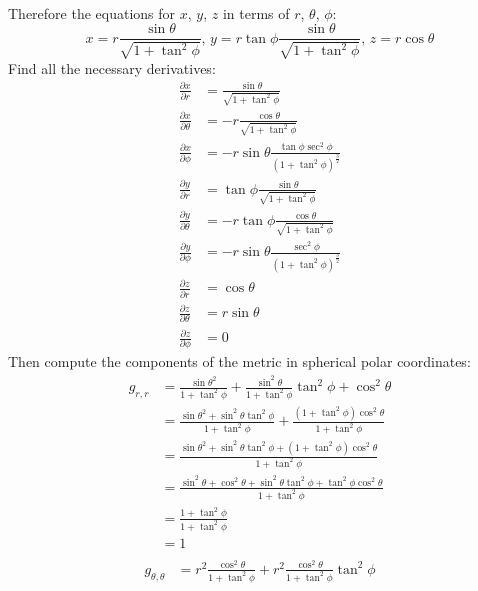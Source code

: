 \documentclass[a4paper]{article}
\begin{document}
\begin{enumerate}
\begin{enumerate}
\[\begin{align*}
    \end{align*}
  \]
  Therefore the equations for $x$, $y$, $z$ in terms of $r$, $\theta$, $\phi$:
  \[
    x = r \frac{\sin\theta}{\sqrt{1+\tan^2\phi} }\text{,\ \ }
    y = r \tan\phi \frac{\sin \theta}{\sqrt{1+\tan^2\phi}}\text{,\ \ }
    z = r \cos\theta
  \]
  Find all the necessary derivatives:
  \[
    \begin{align*}
    \frac{\partial x}{\partial r} &= \frac{\sin\theta}{\sqrt{1+\tan^2\phi}}\\
    \frac{\partial x}{\partial \theta} &= -r\frac{\cos\theta}{\sqrt{1+\tan^2\phi}}\\
    \frac{\partial x}{\partial \phi} &= -r \sin \theta \frac{\tan\phi \sec^2\phi}{(1+\tan^2\phi)^\frac{3}{2}} \\
    \frac{\partial y}{\partial r} &= \tan\phi\frac{\sin\theta}{\sqrt{1+\tan^2\phi} }\\
    \frac{\partial y}{\partial \theta} &= -r \tan\phi\frac{\cos\theta}{\sqrt{1+\tan^2\phi}}\\
    \frac{\partial y}{\partial \phi} &= -r\sin\theta \frac{\sec^2\phi}{(1+\tan^2\phi)^\frac{3}{2}}\\
    \frac{\partial z}{\partial r} &= \cos\theta\\
    \frac{\partial z}{\partial \theta} &= r\sin\theta\\
    \frac{\partial z}{\partial \phi} &= 0
    \end{align*}
  \]
  Then compute the components of the metric in spherical polar coordinates:
  \[
    \begin{align*}
      g_{r,r}&=\frac{\sin\theta^2}{1+\tan^2\phi} + \frac{\sin^2\theta}{1+\tan^2\phi}\tan^2\phi + \cos^2\theta\\
      &=\frac{\sin\theta^2 + \sin^2\theta\tan^2\phi}{1+\tan^2\phi} +\frac{(1+\tan^2\phi)\cos^2\theta}{1+\tan^2\phi}\\
      &=\frac{\sin\theta^2 + \sin^2\theta\tan^2\phi+(1+\tan^2\phi)\cos^2\theta}{1+\tan^2\phi}\\
      &=\frac{\sin^2\theta + \cos^2\theta+\sin^2\theta\tan^2\phi+\tan^2\phi\cos^2\theta}{1+\tan^2\phi}\\
      &=\frac{1+\tan^2\phi}{1+\tan^2\phi}\\
      &=1\\
    \end{align*}
  \]
  \[
    \begin{align*}
      g_{\theta,\theta}&=
      r^2 \frac{\cos^2\theta}{1+\tan^2\phi}+
      r^2 \frac{\cos^2\theta}{1+\tan^2\phi}\tan^2\phi

\end{align*}\]
\end{enumerate}
\end{enumerate}
\end{document}
